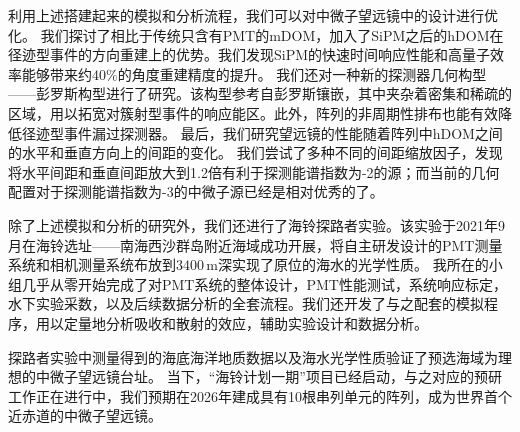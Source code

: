 \begin{cabstract}
利用上述搭建起来的模拟和分析流程，我们可以对中微子望远镜中的设计进行优化。
我们探讨了相比于传统只含有PMT的mDOM，加入了SiPM之后的hDOM在径迹型事件的方向重建上的优势。我们发现SiPM的快速时间响应性能和高量子效率能够带来约$40\%$的角度重建精度的提升。
我们还对一种新的探测器几何构型——彭罗斯构型进行了研究。该构型参考自彭罗斯镶嵌，其中夹杂着密集和稀疏的区域，用以拓宽对簇射型事件的响应能区。此外，阵列的非周期性排布也能有效降低径迹型事件漏过探测器。
最后，我们研究望远镜的性能随着阵列中hDOM之间的水平和垂直方向上的间距的变化。
我们尝试了多种不同的间距缩放因子，发现将水平间距和垂直间距放大到1.2倍有利于探测能谱指数为-2的源；而当前的几何配置对于探测能谱指数为-3的中微子源已经是相对优秀的了。

除了上述模拟和分析的研究外，我们还进行了海铃探路者实验。该实验于2021年9月在海铃选址——南海西沙群岛附近海域成功开展，将自主研发设计的PMT测量系统和相机测量系统布放到$3400\,\mathrm{m}$深实现了原位的海水的光学性质。
我所在的小组几乎从零开始完成了对PMT系统的整体设计，PMT性能测试，系统响应标定，水下实验采数，以及后续数据分析的全套流程。我们还开发了与之配套的模拟程序，用以定量地分析吸收和散射的效应，辅助实验设计和数据分析。

探路者实验中测量得到的海底海洋地质数据以及海水光学性质验证了预选海域为理想的中微子望远镜台址。
当下，“海铃计划一期”项目已经启动，与之对应的预研工作正在进行中，我们预期在2026年建成具有10根串列单元的阵列，成为世界首个近赤道的中微子望远镜。

\end{cabstract}

